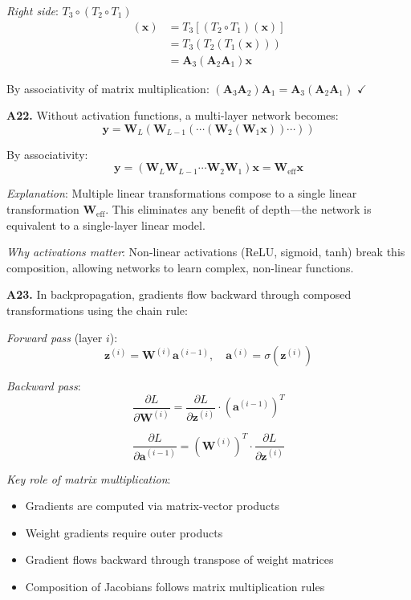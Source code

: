 \documentclass[12pt,a4paper]{article}
\theoremstyle{definition}
\begin{document}
\textit{Right side}: $T_3 \circ (T_2 \circ T_1)$
\begin{align*}
[T_3 \circ (T_2 \circ T_1)](\mathbf{x}) &= T_3[(T_2 \circ T_1)(\mathbf{x})] \\
&= T_3(T_2(T_1(\mathbf{x}))) \\
&= \mathbf{A}_3(\mathbf{A}_2\mathbf{A}_1)\mathbf{x}
\end{align*}

By associativity of matrix multiplication: $(\mathbf{A}_3\mathbf{A}_2)\mathbf{A}_1 = \mathbf{A}_3(\mathbf{A}_2\mathbf{A}_1)$ $\checkmark$

\textbf{A22.} Without activation functions, a multi-layer network becomes:
\[
\mathbf{y} = \mathbf{W}_L(\mathbf{W}_{L-1}(\cdots(\mathbf{W}_2(\mathbf{W}_1\mathbf{x}))\cdots))
\]

By associativity:
\[
\mathbf{y} = (\mathbf{W}_L\mathbf{W}_{L-1}\cdots\mathbf{W}_2\mathbf{W}_1)\mathbf{x} = \mathbf{W}_{\text{eff}}\mathbf{x}
\]

\textit{Explanation}: Multiple linear transformations compose to a single linear transformation $\mathbf{W}_{\text{eff}}$. This eliminates any benefit of depth—the network is equivalent to a single-layer linear model.

\textit{Why activations matter}: Non-linear activations (ReLU, sigmoid, tanh) break this composition, allowing networks to learn complex, non-linear functions.

\textbf{A23.} In backpropagation, gradients flow backward through composed transformations using the chain rule:

\textit{Forward pass} (layer $i$):
\[
\mathbf{z}^{(i)} = \mathbf{W}^{(i)}\mathbf{a}^{(i-1)}, \quad \mathbf{a}^{(i)} = \sigma(\mathbf{z}^{(i)})
\]

\textit{Backward pass}:
\[
\frac{\partial L}{\partial \mathbf{W}^{(i)}} = \frac{\partial L}{\partial \mathbf{z}^{(i)}} \cdot (\mathbf{a}^{(i-1)})^T
\]

\[
\frac{\partial L}{\partial \mathbf{a}^{(i-1)}} = (\mathbf{W}^{(i)})^T \cdot \frac{\partial L}{\partial \mathbf{z}^{(i)}}
\]

\textit{Key role of matrix multiplication}:
\begin{itemize}
\item Gradients are computed via matrix-vector products
\item Weight gradients require outer products
\item Gradient flows backward through transpose of weight matrices
\item Composition of Jacobians follows matrix multiplication rules
\end{itemize}
\end{document}
